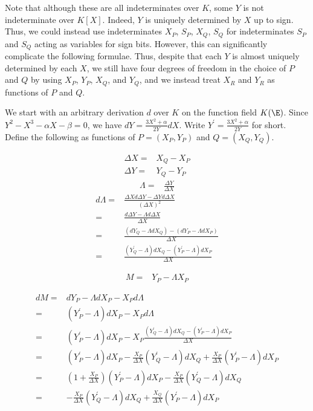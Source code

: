 \documentclass[11pt,letterpaper]{article}
\theoremstyle{definition}
\newcommand{\6}{\mathbf}
\newcommand{\7}{\mathcal}
\begin{document}
Note that although these are all indeterminates over $K$, some $Y$ is not indeterminate over $K[X]$. Indeed, $Y$ is uniquely determined by $X$ up to sign. Thus, we could instead use indeterminates $X_P$, $S_P$, $X_Q$, $S_Q$ for indeterminates $S_P$ and $S_Q$ acting as variables for sign bits. However, this can significantly complicate the following formulae. Thus, despite that each $Y$ is almost uniquely determined by each $X$, we still have four degrees of freedom in the choice of $P$ and $Q$ by using $X_P$, $Y_P$, $X_Q$, and $Y_Q$, and we instead treat $X_R$ and $Y_R$ as functions of $P$ and $Q$.

We start with an arbitrary derivation $d$ over $K$ on the function field $K(\E)$. Since $Y^2 - X^3 - \alpha X - \beta = 0$, we have $dY = \frac{3X^2+\alpha}{2Y}dX$. Write $Y^\prime = \frac{3X^2+\alpha}{2Y}$ for short. Define the following as functions of $P=(X_P, Y_P)$ and $Q=(X_Q,Y_Q)$.

\begin{align}
\Delta X =& X_Q - X_P \label{deltaX}\\
\Delta Y =& Y_Q - Y_P \label{deltaY}
\end{align}
\begin{align}
\Lambda =& \frac{\Delta Y}{\Delta X} \label{BigLambda} 
\end{align}
\begin{align}
d\Lambda =& \frac{\Delta X d \Delta Y - \Delta Y d \Delta X}{(\Delta X)^2}\\
=& \frac{d\Delta Y - \Lambda d \Delta X}{\Delta X} \\
 =& \frac{(dY_Q - \Lambda dX_Q) - (dY_P - \Lambda dX_P)}{\Delta X}\\
=& \frac{\left(Y^\prime_Q - \Lambda\right)dX_Q - \left(Y^\prime_P - \Lambda\right)dX_P}{\Delta X} \label{dBigLambda}
\end{align}

\begin{align}
M =& Y_P - \Lambda X_P \label{bigM}
\end{align}

\begin{align}
dM =& dY_P - \Lambda dX_P - X_P d\Lambda\\
=& \left(Y_P^\prime - \Lambda\right) dX_P - X_P d\Lambda\\
=& \left(Y_P^\prime - \Lambda\right) dX_P - X_P\frac{\left(Y_Q^\prime - \Lambda\right)dX_Q - \left(Y_P^\prime - \Lambda\right)dX_P}{\Delta X} \\
=& \left(Y_P^\prime - \Lambda\right) dX_P - \frac{X_P}{\Delta X} \left(Y_Q^\prime - \Lambda\right)dX_Q + \frac{X_P}{\Delta X}\left(Y_P^\prime - \Lambda\right)dX_P\\
=& \left(1+\frac{X_P}{\Delta X}\right)\left(Y_P^\prime - \Lambda\right) dX_P - \frac{X_P}{\Delta X} \left(Y_Q^\prime - \Lambda\right)dX_Q\\
=& - \frac{X_P}{\Delta X} \left(Y_Q^\prime - \Lambda\right)dX_Q + \frac{X_Q}{\Delta X}\left(Y_P^\prime - \Lambda\right) dX_P \label{dBigM}
\end{align}
\end{document}
